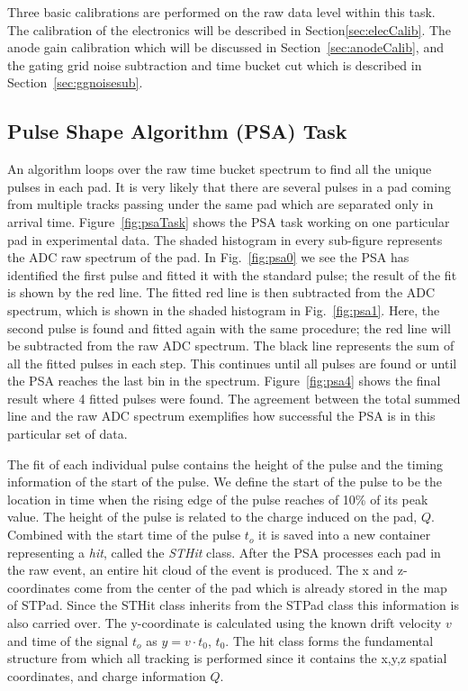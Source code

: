 Three basic calibrations are performed on the raw data level within this task. The calibration of the electronics will be described in Section\ref{sec:elecCalib}. The anode gain calibration which will be discussed in Section~\ref{sec:anodeCalib}, and the gating grid noise subtraction and time bucket cut which is described in Section~\ref{sec:ggnoisesub}.


\subsection{Pulse Shape Algorithm (PSA) Task}
\label{sec:psa}
An algorithm loops over the raw time bucket spectrum to find all the unique pulses in each pad. It is very likely that there are several pulses in a pad coming from multiple tracks passing under the same pad which are separated only in arrival time. Figure~\ref{fig:psaTask} shows the PSA task working on one particular pad in experimental data. The shaded histogram in every sub-figure represents the ADC raw spectrum of the pad. In Fig.~\ref{fig:psa0} we see the PSA has identified the first pulse and fitted it with the standard pulse; the result of the fit is shown by the red line. The fitted red line is then subtracted from the ADC spectrum, which is shown in the shaded histogram in Fig.~\ref{fig:psa1}. Here, the second pulse is found and fitted again with the same procedure; the red line will be subtracted from the raw ADC spectrum. The black line represents the sum of all the fitted pulses in each step. This continues until all pulses are found or until the PSA reaches the last bin in the spectrum. Figure~\ref{fig:psa4} shows the final result where 4 fitted pulses were found. The agreement between the total summed line and the raw ADC spectrum exemplifies how successful the PSA is in this particular set of data. 


The fit of each individual pulse contains the height of the pulse and the timing information of the start of the pulse. We define the start of the pulse to be the location in time when the rising edge of the pulse reaches of 10\% of its peak value. The height of the pulse is related to the charge induced on the pad, $Q$. Combined with the start time of the pulse $t_o$  it is saved into a new container representing a \emph{hit}, called the \emph{STHit} class. After the PSA processes each pad in the raw event, an entire hit cloud of the event is produced. The x and z-coordinates come from the center of the pad which is already stored in the map of STPad. Since the STHit class inherits from the STPad class this information is also carried over. The y-coordinate is calculated using the known drift velocity $v$ and time of the signal $t_o$ as $y = v\cdot t_0$, $t_0$. The hit class forms the fundamental structure from which all tracking is performed since it contains the x,y,z spatial coordinates, and charge information $Q$.

